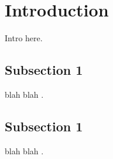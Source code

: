 \section{Introduction}
\label{sec-intro}

Intro here.

\subsection{Subsection 1} blah blah \cite{leapio.asplos20}.

\subsection{Subsection 1} blah blah \blacksquare.

